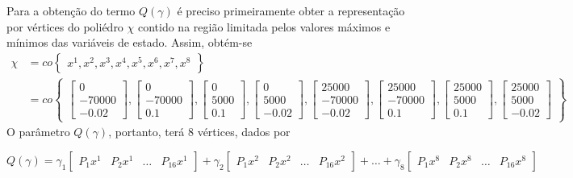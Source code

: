 Para a obtenção do termo $Q(\gamma)$ é preciso primeiramente obter a representação por vértices do poliédro $\chi$ contido na região limitada pelos valores máximos e mínimos das variáveis de estado. Assim, obtém-se
\begin{align*}
\chi &= co\begin{Bmatrix}x^1,x^2,x^3,x^4,x^5,x^6,x^7,x^8\end{Bmatrix}\\
 &= co\begin{Bmatrix}
\begin{bmatrix}0\\-70000\\-0.02\end{bmatrix}, \begin{bmatrix}0\\-70000\\ 0.1\end{bmatrix}, \begin{bmatrix}0\\5000\\ 0.1\end{bmatrix}, \begin{bmatrix}0\\5000\\ -0.02\end{bmatrix}, \begin{bmatrix}25000\\-70000\\-0.02\end{bmatrix}, \begin{bmatrix}25000\\-70000\\ 0.1\end{bmatrix}, \begin{bmatrix}25000\\5000\\ 0.1\end{bmatrix}, \begin{bmatrix}25000\\5000\\ -0.02\end{bmatrix}
\end{Bmatrix}
\end{align*}
O parâmetro $Q(\gamma)$, portanto, terá 8 vértices, dados por

\begin{equation*}
Q(\gamma) = \gamma_1\begin{bmatrix}P_1x^1&P_2x^1&\hdots&P_16x^1\end{bmatrix}+\gamma_2\begin{bmatrix}P_1x^2&P_2x^2&\hdots&P_16x^2\end{bmatrix}+\hdots+\gamma_8\begin{bmatrix}P_1x^8&P_2x^8&\hdots&P_{16}x^8\end{bmatrix}
\end{equation*}


